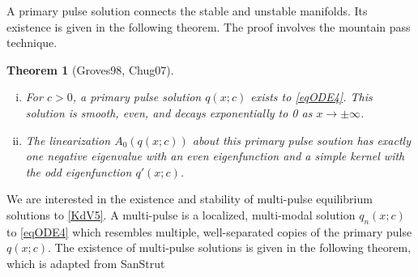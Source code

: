 \documentclass[12pt]{article}
\newtheorem{theorem}{Theorem}
\begin{document}
A primary pulse solution connects the stable and unstable manifolds. Its existence is given in the following theorem. The proof involves the mountain pass technique.

\begin{theorem}[Groves98, Chug07]\label{singleexist}
\[\]
\begin{enumerate}[(i)]
\item For $c>0$, a primary pulse solution $q(x; c)$ exists to \eqref{eqODE4}. This solution is smooth, even, and decays exponentially to 0 as $x \rightarrow \pm \infty$.
\item The linearization $A_0(q(x; c))$ about this primary pulse soution has exactly one negative eigenvalue with an even eigenfunction and a simple kernel with the odd eigenfunction $q'(x; c)$.
\end{enumerate}
\end{theorem}

We are interested in the existence and stability of multi-pulse equilibrium solutions to \eqref{KdV5}. A multi-pulse is a localized, multi-modal solution $q_n(x; c) $to \eqref{eqODE4} which resembles multiple, well-separated copies of the primary pulse $q(x; c)$. The existence of multi-pulse solutions is given in the following theorem, which is adapted from SanStrut
\end{document}
